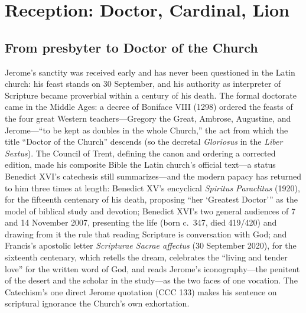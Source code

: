 \section{Reception: Doctor, Cardinal, Lion}

\subsection{From presbyter to Doctor of the Church}

Jerome's sanctity was received early and has never been questioned in the
Latin church: his feast stands on 30 September, and his authority as
interpreter of Scripture became proverbial within a century of his death. The
formal doctorate came in the Middle Ages: a decree of Boniface VIII (1298)
ordered the feasts of the four great Western teachers---Gregory the Great,
Ambrose, Augustine, and Jerome---``to be kept as doubles in the whole
Church,'' the act from which the title ``Doctor of the Church'' descends
(so the decretal \textit{Gloriosus} in the \textit{Liber Sextus}). The
Council of Trent, defining the canon and ordering a corrected edition,
made his composite Bible the Latin church's official text---a status
Benedict XVI's catechesis still summarizes---and the modern papacy has
returned to him three times at length: Benedict XV's encyclical
\textit{Spiritus Paraclitus} (1920), for the fifteenth centenary of his
death, proposing ``her `Greatest Doctor''' as the model of biblical study
and devotion; Benedict XVI's two general audiences of 7 and 14 November
2007, presenting the life (born c.~347, died 419/420) and drawing from it
the rule that reading Scripture is conversation with God; and Francis's
apostolic letter \textit{Scripturae Sacrae affectus} (30 September 2020),
for the sixteenth centenary, which retells the dream, celebrates the
``living and tender love'' for the written word of God, and reads Jerome's
iconography---the penitent of the desert and the scholar in the
study---as the two faces of one vocation. The Catechism's one direct
Jerome quotation (CCC 133) makes his sentence on scriptural ignorance the
Church's own exhortation.


